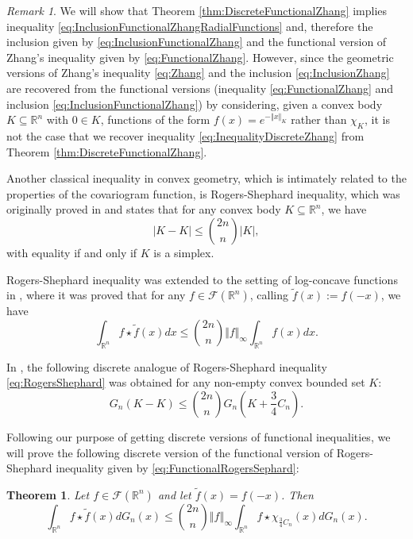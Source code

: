 \documentclass{amsart}
\newcommand{\R}{\mathbb R}
\newcommand{\norma}[1]{\left\Vert#1\right\Vert}
\newtheorem{thm}{Theorem}[section]
\theoremstyle{remark}
\newtheorem{rmk}{Remark}
\theoremstyle{definition}
\numberwithin{equation}{section}
\begin{document}
\begin{rmk}
We will show that Theorem \ref{thm:DiscreteFunctionalZhang} implies inequality \eqref{eq:InclusionFunctionalZhangRadialFunctions} and, therefore the inclusion given by \eqref{eq:InclusionFunctionalZhang} and the functional version of Zhang's inequality given by \eqref{eq:FunctionalZhang}. However, since the geometric versions of Zhang's inequality \eqref{eq:Zhang} and the inclusion \eqref{eq:InclusionZhang} are recovered from the functional versions (inequality \eqref{eq:FunctionalZhang} and inclusion \eqref{eq:InclusionFunctionalZhang}) by considering, given a convex body $K\subseteq\R^n$ with $0\in K$, functions of the form $f(x)=e^{-\Vert x\Vert_K}$ rather than $\chi_K$, it is not the case that we recover inequality \eqref{eq:InequalityDiscreteZhang} from Theorem \ref{thm:DiscreteFunctionalZhang}.
\end{rmk}

Another classical inequality in convex geometry, which is intimately related to the properties of the covariogram function, is Rogers-Shephard inequality, which was originally proved in \cite[Thm. 1]{RS1} and states that for any convex body $K\subseteq\R^n$, we have
\begin{equation}\label{eq:RogersShephard}
|K-K| \leq \binom{2n}{n} |K|,
\end{equation}
with equality if and only if $K$ is a simplex.

Rogers-Shephard inequality was extended to the setting of log-concave functions in \cite[Thm. 2.2]{AGJV1}, where it was proved that for any $f\in\mathcal{F}(\R^n)$, calling $\tilde{f}(x):=f(-x)$, we have
\begin{equation}\label{eq:FunctionalRogersSephard}
\int_{\R^n}f\star\tilde{f}(x)dx\leq\binom{2n}{n}\Vert f\Vert_\infty\int_{\R^n}f(x)dx.
\end{equation}


In \cite[Thm. 1.1]{ALY}, the following discrete analogue of Rogers-Shephard inequality \eqref{eq:RogersShephard} was obtained for any non-empty convex bounded set $K$:
\begin{equation}\label{eq:Rogers-Shephard discrete}
G_n(K-K) \leq \binom{2n}{n} G_n \left( K+ \frac{3}{4}C_n \right).
\end{equation}

Following our purpose of getting discrete versions of functional inequalities, we will prove the following discrete version of the functional version of Rogers-Shephard inequality given by \eqref{eq:FunctionalRogersSephard}:
\begin{thm}\label{thm:DiscreteFunctionalRogersShephard}
Let $f\in\mathcal{F}(\R^n)$ and let $\tilde{f}(x)=f(-x)$. Then
$$
\int_{\R^n} f \star \tilde{f}(x) dG_n(x) \leq \binom{2n}{n} \norma{f}_{\infty} \int_{\R^n} f\star\chi_{\frac{3}{4}C_n}(x) dG_n(x).
$$
\end{thm}
\end{document}
